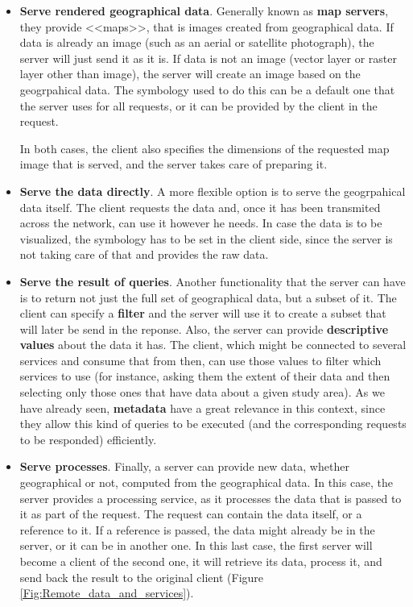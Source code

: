 \begin{itemize}
\item \textbf{Serve rendered geographical data}. Generally known as \textbf{map servers}, they provide <<maps>>, that is images created from geographical data. If data is already an image (such as an aerial or satellite photograph), the server will just send it as it is. If data is not an image (vector layer or raster layer other than image), the server will create an image based on the geogrpahical data. The symbology used to do this can be a default one that the server uses for all requests, or it can be provided by the client in the request. 

In both cases, the client also specifies the dimensions of the requested map image that is served, and the server takes care of preparing it.


\item \textbf{Serve the data directly}. A more flexible option is to serve the geogrpahical data itself. The client requests the data and, once it has been transmited across the network, can use it however he needs. In case the data is to be visualized, the symbology has to be set in the client side, since the server is not taking care of that and provides the raw data.


\item \textbf{Serve the result of queries}. Another functionality that the server can have is to return not just the full set of geographical data, but a subset of it. The client can specify a \textbf{filter} and the server will use it to create a subset that will later be send in the reponse. Also, the server can provide \textbf{descriptive values} about the data it has. The client, which might be connected to several services and consume that from then, can use those values to filter which services to use (for instance, asking them the extent of their data and then selecting only those ones that have data about a given study area). As we have already seen, \textbf{metadata} have a great relevance in this context, since they allow this kind of queries to be executed (and the corresponding requests to be responded) efficiently.

\item \textbf{Serve processes}. Finally, a server can provide new data, whether geographical or not, computed from the geographical data. In this case, the server provides a processing service, as it processes the data that is passed to it as part of the request. The request can contain the data itself, or a reference to it. If a reference is passed, the data might already be in the server, or it can be in another one. In this last case, the first server will become a client of the second one, it will retrieve its data, process it, and send back the result to the original client (Figure \ref{Fig:Remote_data_and_services}).



\end{itemize}
